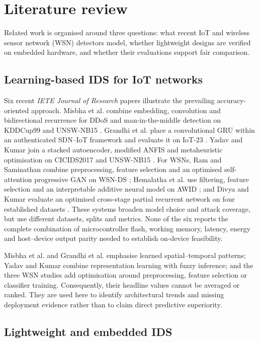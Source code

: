 \documentclass[10pt,letterpaper,twocolumn]{article}
\begin{document}
\section{Literature review}
\label{sec:related}

Related work is organised around three questions: what recent IoT and wireless
sensor network (WSN) detectors model, whether lightweight designs are verified
on embedded hardware, and whether their evaluations support fair comparison.

\subsection{Learning-based IDS for IoT networks}
\label{sec:related:learning}

Six recent \emph{IETE Journal of Research} papers illustrate the prevailing
accuracy-oriented approach. Misbha et al. combine embedding, convolution and
bidirectional recurrence for DDoS and man-in-the-middle detection on KDDCup99
and UNSW-NB15 \cite{misbha2024security}. Grandhi et al. place a convolutional
GRU within an authenticated SDN--IoT framework and evaluate it on IoT-23
\cite{grandhi2025secure}. Yadav and Kumar join a stacked autoencoder, modified
ANFIS and metaheuristic optimisation on CICIDS2017 and UNSW-NB15
\cite{yadav2026anfis}. For WSNs, Ram and Saminathan combine preprocessing,
feature selection and an optimised self-attention progressive GAN on WSN-DS
\cite{ram2025sapgan}; Hemalatha et al. use filtering, feature selection and an
interpretable additive neural model on AWID \cite{hemalatha2025igann}; and
Divya and Kumar evaluate an optimised cross-stage partial recurrent network on
four established datasets \cite{divya2026crossstage}. These systems broaden
model choice and attack coverage, but use different datasets, splits and
metrics. None of the six reports the complete combination of microcontroller
flash, working memory, latency, energy and host--device output parity needed to
establish on-device feasibility.

Misbha et al. and Grandhi et al. emphasise learned spatial--temporal patterns;
Yadav and Kumar combine representation learning with fuzzy inference; and the
three WSN studies add optimisation around preprocessing, feature selection or
classifier training. Consequently, their headline values cannot be averaged
or ranked. They are used here to identify architectural trends and missing
deployment evidence rather than to claim direct predictive superiority.

\subsection{Lightweight and embedded IDS}
\label{sec:related:lightweight}
\end{document}
